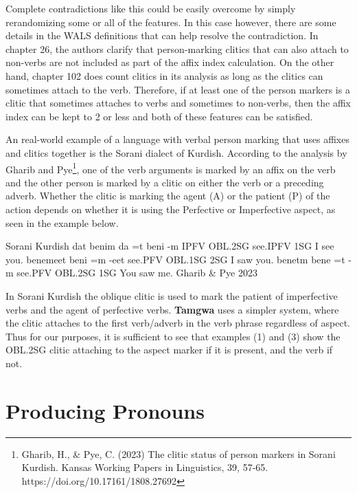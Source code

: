 \documentclass[a4paper,12pt,twoside,openright]{memoir}
\begin{document}
    Complete contradictions like this could be easily overcome by simply rerandomizing some or all of the features.  In this case however, there are some details in the WALS definitions that can help resolve the contradiction.  In chapter 26, the authors clarify that person-marking clitics that can also attach to non-verbs are not included as part of the affix index calculation.  On the other hand, chapter 102 does count clitics in its analysis as long as the clitics can sometimes attach to the verb.  Therefore, if at least one of the person markers is a clitic that sometimes attaches to verbs and sometimes to non-verbs, then the affix index can be kept to 2 or less and both of these features can be satisfied.

    An real-world example of a language with verbal person marking that uses affixes and clitics together is the Sorani dialect of Kurdish.  According to the analysis by Gharib and Pye\footnote{Gharib, H., \& Pye, C. (2023) The clitic status of person markers in Sorani Kurdish. Kansas Working Papers in Linguistics, 39, 57-65. https://doi.org/10.17161/1808.27692}, one of the verb arguments is marked by an affix on the verb and the other person is marked by a clitic on either the verb or a preceding adverb.  Whether the clitic is marking the agent (A) or the patient (P) of the action depends on whether it is using the Perfective or Imperfective aspect, as seen in the example below.

\begin{examples}
    \ex
    \lect Sorani Kurdish
    \words {} dat  benim
    \bits da =t beni -m
    \gloss IPFV OBL.2SG see.IPFV 1SG
    \tr I see you.
    \ex
    \words {} benemeet
    \bits beni =m -eet
    \gloss see.PFV OBL.1SG 2SG
    \tr I saw you.
    \ex
    \words {} benetm
    \bits bene =t -m
    \gloss see.PFV OBL.2SG 1SG
    \tr You saw me.
    \source Gharib \& Pye 2023
\end{examples}

    In Sorani Kurdish the oblique clitic is used to mark the patient of imperfective verbs and the agent of perfective verbs.  \textbf{Tamgwa} uses a simpler system, where the clitic attaches to the first verb/adverb in the verb phrase regardless of aspect.  Thus for our purposes, it is sufficient to see that examples (1) and (3) show the OBL.2SG clitic attaching to the aspect marker if it is present, and the verb if not.

\section*{Producing Pronouns}
\end{document}
